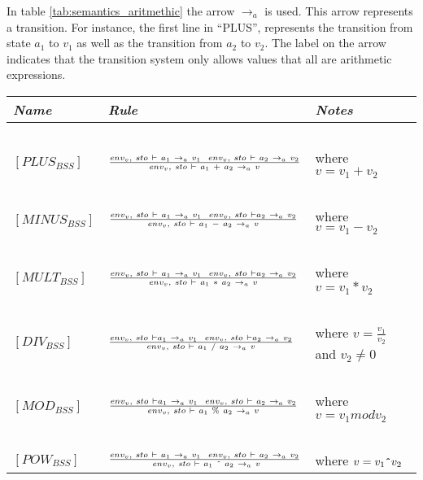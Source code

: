 In table \ref{tab:semantics_aritmethic} the arrow $\rightarrow_{a}$ is used. This arrow represents a transition. For instance, the first line in ``PLUS'', represents the transition from state $a_1$ to $v_1$ as well as the transition from $a_2$ to $v_2$. The label on the arrow indicates that the transition system only allows values that all are arithmetic expressions.

\begin{table}[H]
	\begin{tabular}{|l|l|l|}
	\hline
	\emph{Name}			& \emph{Rule}																															& \emph{Notes} \\ \hline
			~			&															~																			& ~ \\
	$[PLUS_{BSS}]$		& $env_{v},~sto~\vdash~a_{1}~\rightarrow_{a}~v_{1}~~ env_{v},~sto~\vdash~a_{2}~\rightarrow_{a}~v_{2} \over env_{v},~sto~\vdash~a_{1}~+~a_{2}~\rightarrow_{a}~v$ 			& where $v = v_{1}+v_{2}$ \\
			~			&															~																			& ~ \\
	$[MINUS_{BSS}]$		& $env_{v},~sto~\vdash~a_{1}~\rightarrow_{a}~v_{1}~~ env_{v},~sto~\vdash a_{2}~\rightarrow_{a}~v_{2} \over env_{v},~sto~\vdash~a_{1}~-~a_{2}~\rightarrow_{a}~v$ 			& where $v = v_{1}-v_{2}$ \\
			~			&															~																			& ~ \\
	$[MULT_{BSS}]$		& $env_{v},~sto~\vdash~a_{1}~\rightarrow_{a}~v_{1}~~env_{v},~sto~\vdash a_{2}~\rightarrow_{a}~v_{2} \over env_{v},~sto~\vdash~a_{1}~*~a_{2}~\rightarrow_{a}~v$ 			& where $v = v_{1}*v_{2}$ \\
			~			&															~																			& ~ \\
	$[DIV_{BSS}]$		& $env_{v},~sto~\vdash a_{1}~\rightarrow_{a}~v_{1}~~env_{v},~sto ~\vdash a_{2}~\rightarrow_{a}~v_{2} \over env_{v},~sto~\vdash~{a_{1}}~/~{a_{2}}~\rightarrow_{a}~v$ 		& where $v = \frac{v_{1}}{v_{2}}$ and $v_2 \neq 0$\\
			~			&																																		& ~ \\
	$[MOD_{BSS}]$		& $env_{v},~sto~\vdash a_{1}~\rightarrow_{a}~v_{1}~~env_{v},~sto~\vdash~a_{2}~\rightarrow_{a}~v_{2} \over env_{v},~sto~\vdash~a_{1}~\%~a_{2}~\rightarrow_{a}~v$			& where $v = v_{1} mod v_{2}$ \\
			~			&															~																			& ~ \\
	$[POW_{BSS}]$		& $env_{v},~sto~\vdash~a_{1}~\rightarrow_{a}~v_{1}~~env_{v},~sto~\vdash~a_{2}~
	\rightarrow_{a}~v_{2} \over~env_{v},~sto~\vdash~a_{1}~\texttt{\^{}}~a_{2}~\rightarrow_{a}~v$	& where $v = v_{1}\texttt{\^{}}v_{2}$ \\

\end{tabular}
\end{table}
